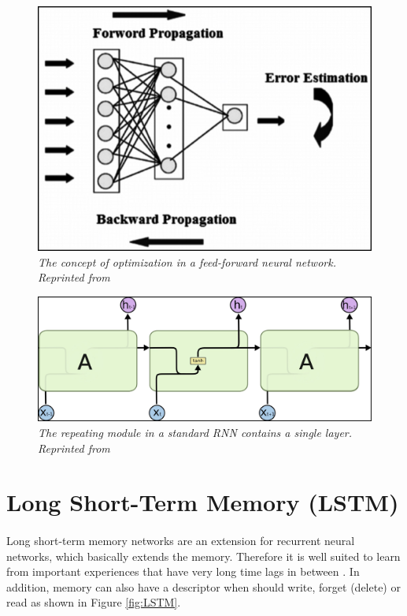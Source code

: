 \begin{figure}[H]
  \centering
  \caption[The concept of optimization in a feed-forward neural network.]{\emph{The concept of optimization in a feed-forward neural network. \\Reprinted from \citeauthor{donges_2019} \citeyear{donges_2019}}}\label{fig:bpp}
  \includegraphics[scale = 0.4]{figures/bpp.jpg}  
\end{figure}

\begin{figure}[H]
  \centering
  \caption[The repeating module in a standard RNN contains a single layer.]{\emph{The repeating module in a standard RNN contains a single layer. \\Reprinted from \citeauthor{olah_2015} \citeyear{olah_2015}}}\label{fig:RNN_2}
  \includegraphics[scale = 0.2]{figures/RNN_2.jpg}  
\end{figure}

\section{Long Short-Term Memory (LSTM)}
\paragraph{}
Long short-term memory networks are an extension for recurrent neural networks, which basically extends the memory. Therefore it is well suited to learn from important experiences that have very long time lags in between \cite{donges_2019,olah_2015}. In addition, memory can also have a descriptor when should write, forget (delete) or read as shown in  Figure \ref{fig:LSTM}.

